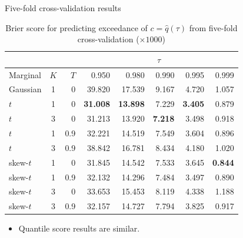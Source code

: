 \documentclass{beamer}
\begin{document}
\begin{frame}{Five-fold cross-validation results}
  \begin{table}[htbp]
    \small
    \centering
    \begin{tabular}{l|c|r|rrrrr}
          \multicolumn{3}{c}{\ } & \multicolumn{5}{c}{$\tau$}\\
           \hline
  Marginal & $K$ & $T$  & 0.950 & 0.980 & 0.990 & 0.995 & 0.999\\
  \hline
Gaussian 	& 1 & 0 	& 39.820 & 17.539 & 9.167 & 4.720 & 1.057\\
$t$		& 1 & 0 	& {\bf 31.008} & {\bf 13.898} & 7.229 & {\bf 3.405} & 0.879\\
$t$		& 3 & 0	& 31.213 & 13.920 & {\bf 7.218} & 3.498 & 0.918\\
$t$		& 1 & 0.9	& 32.221 & 14.519 & 7.549 & 3.604 & 0.896\\
$t$		& 3 & 0.9 	& 38.842 & 16.781 & 8.434 & 4.180 & 1.020\\
skew-$t$	& 1 & 0	& 31.845 & 14.542 & 7.533 & 3.645 & {\bf 0.844}\\
skew-$t$	& 1 & 0.9	& 32.132 & 14.296 & 7.484 & 3.497 & 0.890\\
skew-$t$	& 3 & 0	& 33.653 & 15.453 & 8.119 & 4.338 & 1.188\\
skew-$t$	& 3 & 0.9 	& 32.157 & 14.727 & 7.794 & 3.825 & 0.917\\
\hline
    \end{tabular}
    \caption{Brier score for predicting exceedance of $c = \hat{q}(\tau)$ from five-fold cross-validation ($\times 1000$)}
  \end{table} \vspace{-1.5em}
  \begin{itemize}
  	\item Quantile score results are similar.
  \end{itemize}
\end{frame}
\end{document}
